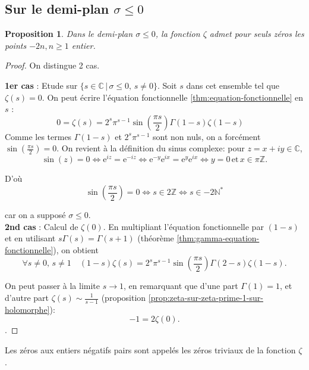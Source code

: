 \documentclass[french]{report}
\newtheorem{proposition}[theorem]{Proposition}
\begin{document}
\subsection{Sur le demi-plan $\sigma\leq 0$}

\begin{proposition}
  Dans le demi-plan $\sigma\leq0$, la fonction $\zeta$ admet pour seuls zéros les points $-2n, n\geq1$ entier.
\end{proposition}

\begin{proof}
  On distingue 2 cas.

  \textbf{1er cas} : Etude sur $\{s\in\mathbb{C}\,|\,\sigma\leq 0,\,s\neq 0\}$. Soit $s$ dans cet ensemble tel que $\zeta(s)=0$. On peut écrire l'équation fonctionnelle \ref{thm:equation-fonctionnelle} en $s$ :
  \[
    0 = \zeta(s)
    = 2^s\pi^{s-1}\sin\left(\frac{\pi s}{2}\right)\Gamma(1-s)\zeta(1-s)\quad
  \]
  Comme les termes $\Gamma(1-s)$ et $2^s\pi^{s-1}$ sont non nuls, on a forcément $\sin(\frac{\pi s}{2})=0$. On revient à la définition du sinus complexe: pour $z=x+iy\in\mathbb{C}$,
  \[
    \sin(z)=0
    \Leftrightarrow \mathrm{e}^{iz}=\mathrm{e}^{-iz}\Leftrightarrow \mathrm{e}^{-y}\mathrm{e}^{ix}=\mathrm{e}^y\mathrm{e}^{ix}
    \Leftrightarrow y=0\,\mathrm{et}\,x\in\pi\mathbb{Z}.
  \]
  
  D'où 
  \[
    \sin(\frac{\pi s}{2})=0
    \Leftrightarrow s\in2\mathbb{Z}
    \Leftrightarrow s\in-2\mathbb{N}^*
  \]

  car on a supposé $\sigma\leq 0$.
  \\
  
  \textbf{2nd cas} : Calcul de $\zeta(0)$. En multipliant l'équation fonctionnelle par $(1-s)$ et en utilisant $s\Gamma(s)=\Gamma(s+1)$ (théorème \ref{thm:gamma-equation-fonctionnelle}), on obtient
  \[
    \forall s\neq0,\,s\neq1\quad
    (1-s)\zeta(s) = 2^s\pi^{s-1}\sin\left(\frac{\pi s}{2}\right)\Gamma(2-s)\zeta(1-s).
  \]

  On peut passer à la limite $s\to1$, en remarquant que d'une part $\Gamma(1)=1$, et d'autre part $\zeta(s)\sim\frac{1}{s-1}$ (proposition \ref{prop:zeta-sur-zeta-prime-1-sur-holomorphe}):
  \[
    -1 = 2\zeta(0).
  \].
\end{proof}

Les zéros aux entiers négatifs pairs sont appelés les zéros triviaux de la fonction $\zeta$.

\end{document}

